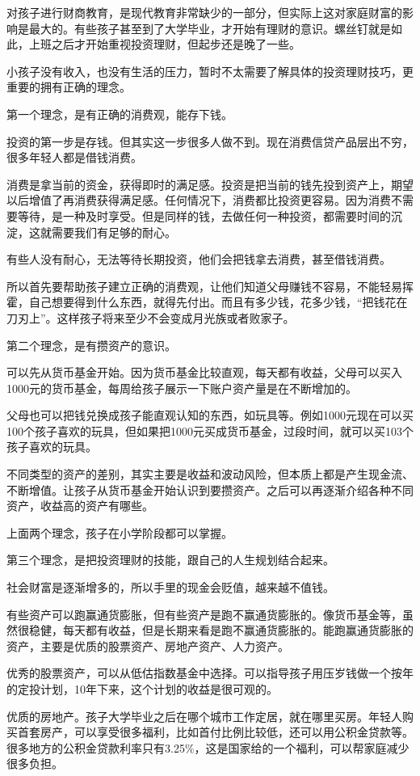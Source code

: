对孩子进行财商教育，是现代教育非常缺少的一部分，但实际上这对家庭财富的影响是最大的。有些孩子甚至到了大学毕业，才开始有理财的意识。螺丝钉就是如此，上班之后才开始重视投资理财，但起步还是晚了一些。

小孩子没有收入，也没有生活的压力，暂时不太需要了解具体的投资理财技巧，更重要的拥有正确的理念。

第一个理念，是有正确的消费观，能存下钱。

投资的第一步是存钱。但其实这一步很多人做不到。现在消费信贷产品层出不穷，很多年轻人都是借钱消费。

消费是拿当前的资金，获得即时的满足感。投资是把当前的钱先投到资产上，期望以后增值了再消费获得满足感。任何情况下，消费都比投资更容易。因为消费不需要等待，是一种及时享受。但是同样的钱，去做任何一种投资，都需要时间的沉淀，这就需要我们有足够的耐心。

有些人没有耐心，无法等待长期投资，他们会把钱拿去消费，甚至借钱消费。

所以首先要帮助孩子建立正确的消费观，让他们知道父母赚钱不容易，不能轻易挥霍，自己想要得到什么东西，就得先付出。而且有多少钱，花多少钱，“把钱花在刀刃上”。这样孩子将来至少不会变成月光族或者败家子。

第二个理念，是有攒资产的意识。

可以先从货币基金开始。因为货币基金比较直观，每天都有收益，父母可以买入1000元的货币基金，每周给孩子展示一下账户资产量是在不断增加的。

父母也可以把钱兑换成孩子能直观认知的东西，如玩具等。例如1000元现在可以买100个孩子喜欢的玩具，但如果把1000元买成货币基金，过段时间，就可以买103个孩子喜欢的玩具。

不同类型的资产的差别，其实主要是收益和波动风险，但本质上都是产生现金流、不断增值。让孩子从货币基金开始认识到要攒资产。之后可以再逐渐介绍各种不同资产，收益高的资产有哪些。

上面两个理念，孩子在小学阶段都可以掌握。

第三个理念，是把投资理财的技能，跟自己的人生规划结合起来。

社会财富是逐渐增多的，所以手里的现金会贬值，越来越不值钱。

有些资产可以跑赢通货膨胀，但有些资产是跑不赢通货膨胀的。像货币基金等，虽然很稳健，每天都有收益，但是长期来看是跑不赢通货膨胀的。能跑赢通货膨胀的资产，主要是优质的股票资产、房地产资产、人力资产。

优秀的股票资产，可以从低估指数基金中选择。可以指导孩子用压岁钱做一个按年的定投计划，10年下来，这个计划的收益是很可观的。

优质的房地产。孩子大学毕业之后在哪个城市工作定居，就在哪里买房。年轻人购买首套房产，可以享受很多福利，比如首付比例比较低，还可以用公积金贷款等。很多地方的公积金贷款利率只有3.25\%，这是国家给的一个福利，可以帮家庭减少很多负担。

